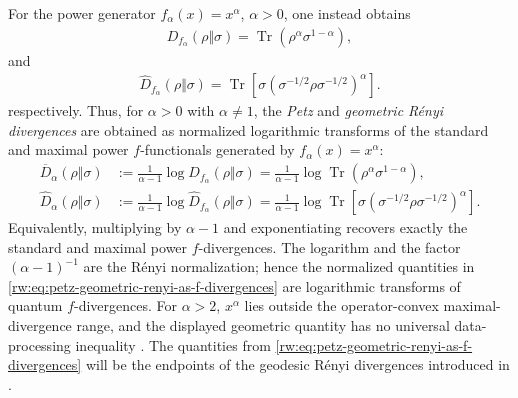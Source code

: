 \documentclass[11pt]{article}
\theoremstyle{remark}
\newcommand{\1}{\mathbbm{1}}
\begin{document}
For the power generator
$f_\alpha(x)=x^\alpha$, $\alpha>0$, one instead obtains
\begin{equation}
 \begin{aligned}
 D_{f_\alpha}(\rho\Vert\sigma)
 =\operatorname{Tr}(\rho^\alpha\sigma^{1-\alpha}),
 \end{aligned}
 \label{rw:eq:standard-power-functionals}
\end{equation}
and
\begin{equation}
 \begin{aligned}
 \widehat D_{f_\alpha}(\rho\Vert\sigma)
 =\operatorname{Tr}\!\left[
 \sigma(\sigma^{-1/2}\rho\sigma^{-1/2})^\alpha\right].
 \end{aligned}
 \label{rw:eq:maximal-power-functionals}
\end{equation}
respectively. Thus, for $\alpha>0$ with $\alpha\neq1$, the \textit{Petz} and \textit{geometric
R\'enyi divergences} \cite[Definition~2]{fang2021geometric} are obtained as normalized logarithmic transforms
of the standard and maximal power $f$-functionals generated by
$f_\alpha(x)=x^\alpha$:
\begin{equation}
 \begin{aligned}
 \overline{D}_\alpha(\rho\Vert\sigma)
 &:=\frac{1}{\alpha-1}
 \log D_{f_\alpha}(\rho\Vert\sigma)
 =\frac{1}{\alpha-1}
 \log\operatorname{Tr}(\rho^\alpha\sigma^{1-\alpha}),\\
\widehat D_\alpha(\rho\Vert\sigma)
 &:=\frac{1}{\alpha-1}
 \log \widehat D_{f_\alpha}(\rho\Vert\sigma)
 =\frac{1}{\alpha-1}
 \log\operatorname{Tr}\!\left[
 \sigma(\sigma^{-1/2}\rho\sigma^{-1/2})^\alpha\right].
 \end{aligned}
 \label{rw:eq:petz-geometric-renyi-as-f-divergences}
\end{equation}
Equivalently, multiplying by $\alpha-1$ and exponentiating recovers
exactly the standard and maximal power $f$-divergences.  The logarithm and the factor
$(\alpha-1)^{-1}$ are the R\'enyi normalization; hence the normalized
quantities in \eqref{rw:eq:petz-geometric-renyi-as-f-divergences} are
logarithmic transforms of quantum $f$-divergences.  For $\alpha>2$,
$x^\alpha$ lies outside the operator-convex maximal-divergence range,
and the displayed geometric quantity has no universal data-processing
inequality \cite[Remark~3.23 and Corollary~3.31]{hiai2017different}.
The quantities from \eqref{rw:eq:petz-geometric-renyi-as-f-divergences}
will be the endpoints of the geodesic Rényi divergences introduced
in .
\end{document}
